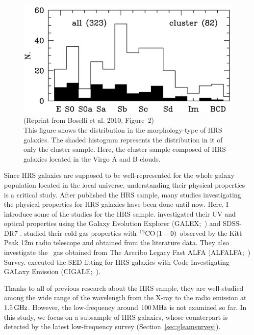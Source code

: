 \begin{figure}[htbp]
	\centering
	\includegraphics[width=.8\linewidth]{Chapter_3/Figures/Boselli2010_Figure2.png}
    \caption[Reprint from Boselli et al. 2010 (Figure~2)]{\label{fig:Boselli2010_figure2}
        (Reprint from Boselli et al. 2010, Figure~2)\\
        This figure shows the distribution in the morphology-type of HRS galaxies.
        The shaded histogram represents the distribution in it of only the cluster sample.
        Here, the cluster sample composed of HRS galaxies located in the Virgo A and B clouds.
    }
\end{figure}

Since HRS galaxies are supposed to be well-represented for the whole galaxy population located in the local universe, understanding their physical properties is a critical study.
After \citet{Boselli2010} published the HRS sample, many studies investigating the physical properties for HRS galaxies have been done until now.
Here, I introduce some of the studies for the HRS sample.
\citet{Cortese2012} investigated their UV and optical properties using the Galaxy Evolution Explorer (GALEX;~\citealt{Martin2005}) and SDSS-DR7 \citep{Abazajian2009}.
\citet{Boselli2014} studied their cold gas properties with $^{12}\mathrm{CO}\left(1-0\right)$ observed by the Kitt Peak 12m radio telescope and obtained from the literature data.
They also investigate the \nh~gas obtained from The Arecibo Legacy Fast ALFA (ALFALFA;~\citealt{Giovanelli2005, Haynes2011}) Survey.
\citet{Ciesla2014} executed the SED fitting for HRS galaxies with Code Investigating GALaxy Emission (CIGALE;~\citealt{Noll2009}).

Thanks to all of previous research about the HRS sample, they are well-studied among the wide range of the wavelength from the X-ray to the radio emission at $1.5\,\mathrm{GHz}$.
However, the low-frequency around $100\,\mathrm{MHz}$ is not examined so far.
In this study, we focus on a subsample of HRS galaxies, whose counterpart is detected by the latest low-frequency survey (Section~\ref{sec:gleamsurvey}).



